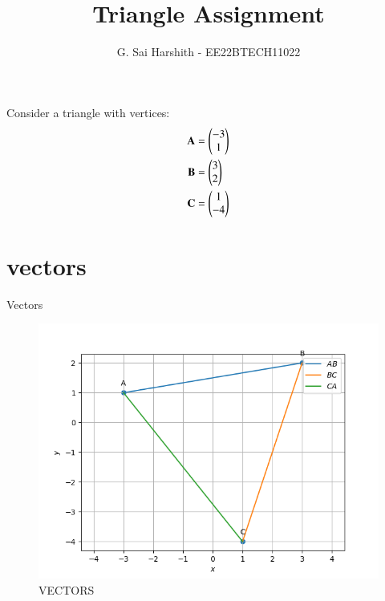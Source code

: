 \documentclass[journal,12pt,onecolumn]{IEEEtran}
\theoremstyle{remark}
\begin{document}


\vspace{3cm}
\title{
Triangle Assignment
}
\author{G. Sai Harshith - EE22BTECH11022	
}

\maketitle
\bigskip
\renewcommand{\thefigure}{\theenumi}
\renewcommand{\thetable}{\theenumi}
Consider a triangle with vertices:
\begin{align}
\mathbf{A} &= \begin{pmatrix}-3\\1\end{pmatrix}\\
\mathbf{B} &= \begin{pmatrix}3\\2\end{pmatrix}\\
\mathbf{C} &= \begin{pmatrix}1\\-4\end{pmatrix}
\end{align}
\begin{table}[!ht]
	\section{vectors}
	\centering
	
	\caption{Vectors}
	\label{table:vectors}
\end{table}
\begin{figure}
\includegraphics[width=\columnwidth]{./figs/Q1.1.3.png}
\caption{VECTORS}
\label{fig:vectors}
\end{figure}
\end{document}
